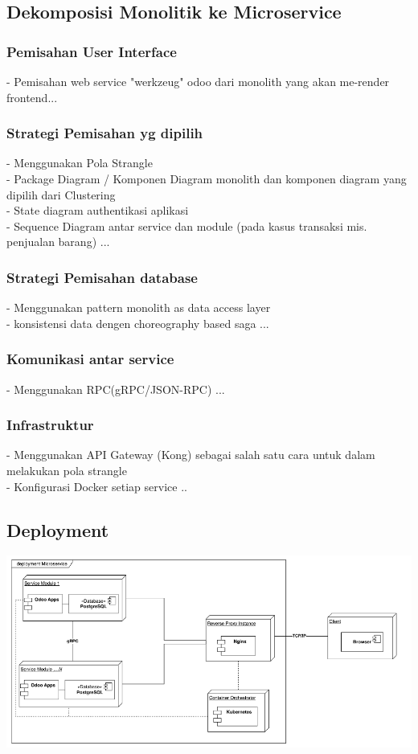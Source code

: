 \subsection{Dekomposisi Monolitik ke Microservice}
\subsubsection{Pemisahan User Interface}
- Pemisahan web service "werkzeug" odoo dari monolith yang akan me-render frontend...
\subsubsection{Strategi Pemisahan yg dipilih}
- Menggunakan Pola Strangle \\
- Package Diagram / Komponen Diagram monolith dan komponen diagram yang dipilih dari Clustering\\
- State diagram authentikasi aplikasi \\
- Sequence Diagram antar service dan module (pada kasus transaksi mis. penjualan barang) ... \\
\subsubsection{Strategi Pemisahan database}
- Menggunakan pattern monolith as data access layer\\
- konsistensi data dengen choreography based saga ...
\subsubsection{Komunikasi antar service}
- Menggunakan RPC(gRPC/JSON-RPC) ...
\subsubsection{Infrastruktur}
- Menggunakan API Gateway (Kong) sebagai salah satu cara untuk dalam melakukan pola strangle \\
- Konfigurasi Docker setiap service ..
\subsection{Deployment}
\begin{center}
	\includegraphics[width=14cm]{img/Deployment.png}
	\label{fig:asd}
\end{center}
